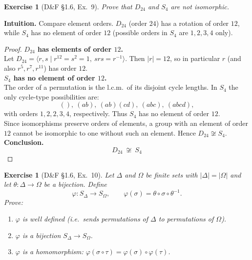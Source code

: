 \documentclass[12pt]{article}
\newtheorem{exercise}[theorem]{Exercise}
\theoremstyle{definition}
\begin{document}
\newpage

\begin{exercise}[D\&F §1.6, Ex.~9]
Prove that $D_{24}$ and $S_4$ are not isomorphic.
\end{exercise}

\dotfill

\noindent\textbf{Intuition.}
Compare element orders. $D_{24}$ (order $24$) has a rotation of order $12$, while $S_4$ has no element of order $12$ (possible orders in $S_4$ are $1,2,3,4$ only).\\

\dotfill

\begin{proof}
\noindent\textbf{$D_{24}$ has elements of order $12$.}\\
\noindent Let $D_{24}=\langle r,s\mid r^{12}=s^2=1,\ srs=r^{-1}\rangle$. Then $|r|=12$, so in particular $r$ (and also $r^5,r^7,r^{11}$) has order $12$.\\

\noindent\textbf{$S_4$ has no element of order $12$.}\\
\noindent The order of a permutation is the l.c.m.\ of its disjoint cycle lengths. In $S_4$ the only cycle-type possibilities are:
\[
(),\ (ab),\ (ab)(cd),\ (abc),\ (abcd),
\]
with orders $1,2,2,3,4$, respectively. Thus $S_4$ has no element of order $12$.\\

\noindent Since isomorphisms preserve orders of elements, a group with an element of order $12$ cannot be isomorphic to one without such an element. Hence $D_{24}\not\cong S_4$.\\

\noindent\textbf{Conclusion.}
\[
\boxed{\,D_{24}\ \not\cong\ S_4\,}
\]
\end{proof}

\newpage

\begin{exercise}[D\&F §1.6, Ex.~10]
Let $\Delta$ and $\Omega$ be finite sets with $|\Delta|=|\Omega|$ and let $\theta:\Delta\to\Omega$ be a bijection. Define
\[
\varphi:S_\Delta\longrightarrow S_\Omega,\qquad \varphi(\sigma)=\theta\circ\sigma\circ\theta^{-1}.
\]
Prove:
\begin{enumerate}
\item[(a)] $\varphi$ is well defined (i.e.\ sends permutations of $\Delta$ to permutations of $\Omega$).
\item[(b)] $\varphi$ is a bijection $S_\Delta\to S_\Omega$.
\item[(c)] $\varphi$ is a homomorphism: $\varphi(\sigma\circ\tau)=\varphi(\sigma)\circ\varphi(\tau)$.
\end{enumerate}
\end{exercise}
\end{document}
